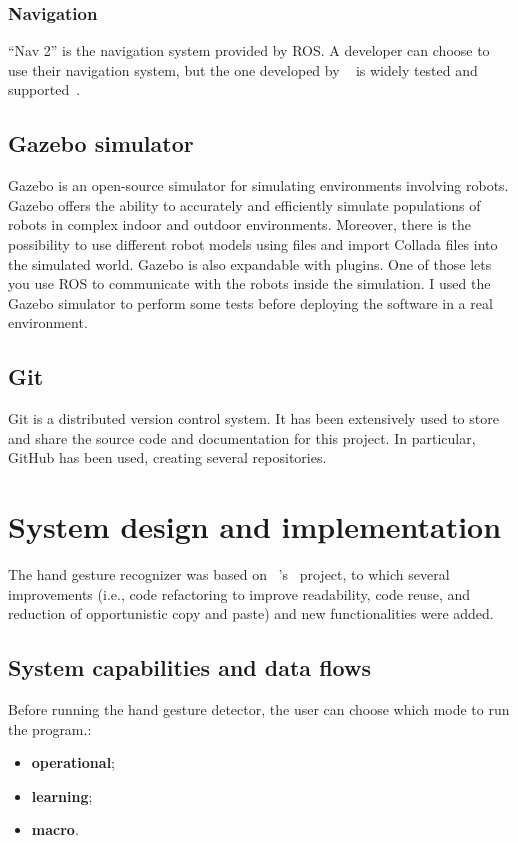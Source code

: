 \documentclass[../thesis.tex]{subfiles}
\begin{document}
\subsubsection{Navigation}
``Nav 2'' is the navigation system provided by \gls{ROS}. A developer can choose to use their navigation system, but the one developed by ~\citeauthor{paper:navigation2} is widely tested and supported~\cite{paper:navigation2}. 

\subsection{Gazebo simulator}
Gazebo is an open-source simulator for simulating environments involving robots. Gazebo offers the ability to accurately and efficiently simulate populations of robots in complex indoor and outdoor environments. Moreover, there is the possibility to use different robot models using   files and import Collada files into the simulated world. Gazebo is also expandable with plugins. One of those lets you use \acrshort{ROS} to communicate with the robots inside the simulation. I used the Gazebo simulator to perform some tests before deploying the software in a real environment.  

\subsection{Git}
Git is a distributed version control system. It has been extensively used to store and share the source code and documentation for this project. In particular, GitHub has been used, creating several repositories.

\section{System design and implementation}\label{sec:system_design_and_implementation}
The hand gesture recognizer was based on ~\citeauthor{site:hand_gesture_base_repo}'s~\cite{site:hand_gesture_base_repo} project, to which several improvements (i.e., code refactoring to improve readability, code reuse, and reduction of opportunistic copy and paste) and new functionalities were added.
\subsection{System capabilities and data flows}
Before running the hand gesture detector, the user can choose which mode to run the program.:
\begin{itemize}
    \item \textbf{operational};
    \item \textbf{learning};
    \item \textbf{macro}.
\end{itemize}
\end{document}

